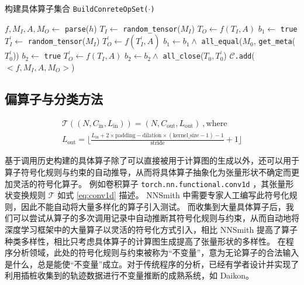 \begin{algorithm}
    \caption{构建具体算子集合 \texttt{BuildConreteOpSet($\cdot$)}}
    \label{algo:build_copset}

 {
    $f, M_I, A, M_O \gets$ \texttt{parse}($h$) 
    $T_I \gets$ \texttt{random\_tensor}($M_I$) 
    $T_O \gets f(T_I, A)$ 
     {
        $b_1 \gets$ \texttt{true} \label{algo:build_copset:meq:s}\;
         {
            $T_I^{'} \gets$ \texttt{random\_tensor}($M_I$)\;
            $T_O^{'} \gets f(T_I^{'}, A)$\;
            $b_1 \gets b_1 \wedge$ \texttt{all\_equal}($M_0$, \texttt{get\_meta}($T_0^{'}$))\;
        }
         {\Continue} \label{algo:build_copset:meq:e}
        $b_2 \gets$ \texttt{true} \label{algo:build_copset:tclose:s} \;
         {
            $T_O^{'} \gets f(T_I, A)$\;
            $b_2 \gets b_2 \wedge$ \texttt{all\_close}($T_0, T_0^{'}$)\;
        }
         {\Continue} \label{algo:build_copset:tclose:e}
        $\mathcal{C}$\texttt{.add}($<f, M_I, A, M_O>$)\;
    }
}
\end{algorithm}

\subsection{偏算子与分类方法}
\label{sec:partialop}

\begin{equation}
\label{eq:conv1d}
\begin{gathered}
\mathcal{T}((N, C_\text{in}, L_\text{in})) = 
(N, C_\text{out}, L_\text{out}) ~, \text{where} \\
L_\text{out} =
\lfloor \frac{L_\text{in} + 2 \times \text{padding} - \text{dilation} \times (\text{kernel\_size} - 1) - 1}{\text{stride}} + 1 \rfloor
\end{gathered}
\end{equation}


基于调用历史构建的具体算子除了可以直接被用于计算图的生成以外，还可以用于算子符号化规则与约束的自动推导，从而将具体算子抽象化为张量形状不确定而更加灵活的符号化算子。
例如卷积算子 \texttt{torch.nn.functional.conv1d} ，其张量形状变换规则 $\mathcal{T}$ 如式 \eqref{eq:conv1d} 描述\cite{torch_conv1d}。
NNSmith 中需要专家人工编写此符号化规则，因此不能自动将大量多样化的算子引入测试。
而收集到大量具体算子后，我们可以尝试从算子的多次调用记录中自动推断其符号化规则与约束，从而自动地将深度学习框架中的大量算子以灵活的符号化方式引入，相比 NNSmith 提高了算子种类多样性，相比只考虑具体算子的计算图生成提高了张量形状的多样性。
在程序分析领域，此处的符号化规则与约束被称为“不变量”，意为无论算子的合法输入是什么，总是能使“不变量”成立。对于传统程序的分析，已经有学者设计并实现了利用插桩收集到的轨迹数据进行不变量推断的成熟系统，如 Daikon\cite{daikon}。

